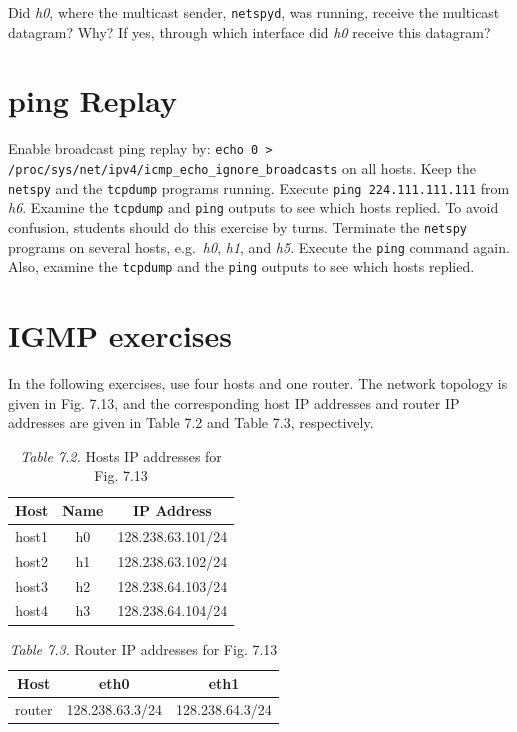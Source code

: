 \documentclass{../UTNetLab}
\begin{document}
    Did \textit{h0}, where the multicast sender, \lstinline{netspyd}, was running, receive the multicast datagram?
    Why?
    If yes, through which interface did \textit{h0} receive this datagram?

\section{ping Replay}
    Enable broadcast ping replay by: \lstinline{echo 0 > /proc/sys/net/ipv4/icmp_echo_ignore_broadcasts} on all hosts.
    Keep the \lstinline{netspy} and the \lstinline{tcpdump} programs running.
    Execute \lstinline{ping 224.111.111.111} from \textit{h6}.
    Examine the \lstinline{tcpdump} and \lstinline{ping} outputs to see which hosts replied.
    To avoid confusion, students should do this exercise by turns.
    Terminate the \lstinline{netspy} programs on several hosts, e.g.\ \textit{h0}, \textit{h1}, and \textit{h5}.
    Execute the \lstinline{ping} command again.
    Also, examine the \lstinline{tcpdump} and the \lstinline{ping} outputs to see which hosts replied.

\section*{IGMP exercises}
    In the following exercises, use four hosts and one router. The network topology is given in Fig. 7.13, and the corresponding host IP addresses and router IP addresses are given in Table 7.2 and Table 7.3, respectively.

    \begin{table}[H]
        \caption{\textit{Table 7.2.} Hosts IP addresses for Fig. 7.13}
        \label{tbl:7.2}
        \centering
        \begin{tabular}{ *3c }
            \hline \hline
            Host & Name & IP Address \\
            \hline
                host1 & h0 & 128.238.63.101/24 \\
                host2 & h1   & 128.238.63.102/24 \\
                host3 & h2   & 128.238.64.103/24 \\
                host4 & h3   & 128.238.64.104/24 \\
            \hline \hline
            \end{tabular}
    \end{table}

    \begin{table}[H]
        \caption{\textit{Table 7.3.} Router IP addresses for Fig. 7.13}
        \label{tbl:7.3}
        \centering
        \begin{tabular}{ *3c }
            \hline \hline
            Host & eth0 & eth1 \\
            \hline
            router & 128.238.63.3/24 & 128.238.64.3/24 \\
            \hline \hline
            \end{tabular}
    \end{table}
\end{document}
